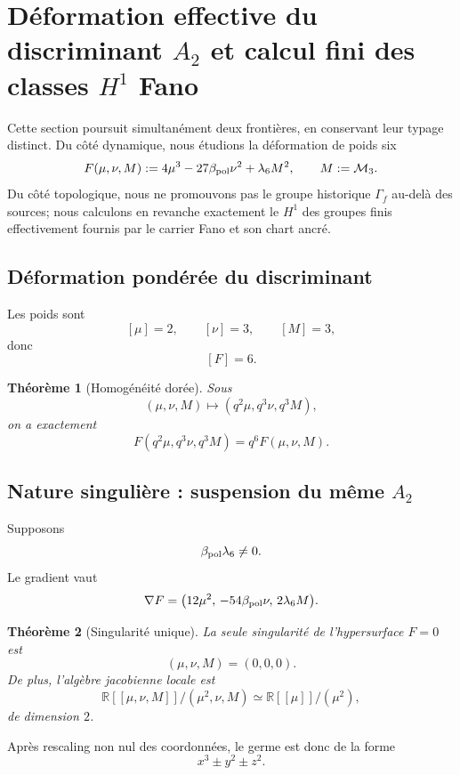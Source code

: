 \documentclass[11pt,a4paper]{article}
\newtheorem{theorem}{Théorème}[section]
\begin{document}
\section{Déformation effective du discriminant \texorpdfstring{$A_2$}{A2} et calcul fini des classes \texorpdfstring{$H^1$}{H1} Fano}\label{sec:v21-effective-A2-fano-H1}

Cette section poursuit simultanément deux frontières, en conservant leur typage distinct. Du côté dynamique, nous étudions la déformation de poids six
\[
 F(\mu,\nu,M)
 :=
 4\mu^3-27\beta_{\rm pol}\nu^2+\lambda_6M^2,
 \qquad
 M:=\mathcal M_3.
\]
Du côté topologique, nous ne promouvons pas le groupe historique $\Gamma_f$ au-delà des sources; nous calculons en revanche exactement le $H^1$ des groupes finis effectivement fournis par le carrier Fano et son chart ancré.

\subsection{Déformation pondérée du discriminant}

Les poids sont
\[
 [\mu]=2,\qquad [\nu]=3,\qquad[M]=3,
\]
donc
\[
 [F]=6.
\]

\begin{theorem}[Homogénéité dorée]\label{thm:v21-homogeneous}
Sous
\[
 (\mu,\nu,M)\longmapsto(q^2\mu,q^3\nu,q^3M),
\]
on a exactement
\[
 \boxed{
 F(q^2\mu,q^3\nu,q^3M)=q^6F(\mu,\nu,M).}
\]
\end{theorem}

\subsection{Nature singulière : suspension du même \texorpdfstring{$A_2$}{A2}}

Supposons
\[
 \beta_{\rm pol}\lambda_6\neq0.
\]
Le gradient vaut
\[
 \nabla F
 =
 \bigl(
 12\mu^2,\,
 -54\beta_{\rm pol}\nu,\,
 2\lambda_6M
 \bigr).
\]

\begin{theorem}[Singularité unique]\label{thm:v21-singular-locus}
La seule singularité de l'hypersurface $F=0$ est
\[
 \boxed{(\mu,\nu,M)=(0,0,0).}
\]
De plus, l'algèbre jacobienne locale est
\[
 \mathbb R[\![\mu,\nu,M]\!]
 \Big/
 (\mu^2,\nu,M)
 \simeq
 \mathbb R[\![\mu]\!]/(\mu^2),
\]
de dimension $2$.
\end{theorem}

Après rescaling non nul des coordonnées, le germe est donc de la forme
\[
 x^3\pm y^2\pm z^2.
\]
\end{document}
